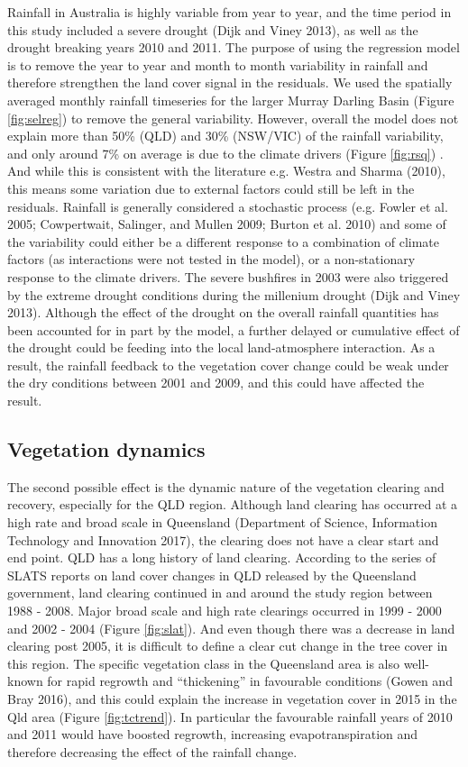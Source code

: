 \documentclass[fleqn,10pt,lineno]{wlpeerj} %
\begin{document}
Rainfall in Australia is highly variable from year to year, and the time
period in this study included a severe drought (Dijk and Viney 2013), as
well as the drought breaking years 2010 and 2011. The purpose of using
the regression model is to remove the year to year and month to month
variability in rainfall and therefore strengthen the land cover signal
in the residuals. We used the spatially averaged monthly rainfall
timeseries for the larger Murray Darling Basin (Figure \ref{fig:selreg})
to remove the general variability. However, overall the model does not
explain more than 50\% (QLD) and 30\% (NSW/VIC) of the rainfall
variability, and only around 7\% on average is due to the climate
drivers (Figure \ref{fig:rsq}) . And while this is consistent with the
literature e.g. Westra and Sharma (2010), this means some variation due
to external factors could still be left in the residuals. Rainfall is
generally considered a stochastic process (e.g. Fowler et al. 2005;
Cowpertwait, Salinger, and Mullen 2009; Burton et al. 2010) and some of
the variability could either be a different response to a combination of
climate factors (as interactions were not tested in the model), or a
non-stationary response to the climate drivers. The severe bushfires in
2003 were also triggered by the extreme drought conditions during the
millenium drought (Dijk and Viney 2013). Although the effect of the
drought on the overall rainfall quantities has been accounted for in
part by the model, a further delayed or cumulative effect of the drought
could be feeding into the local land-atmosphere interaction. As a
result, the rainfall feedback to the vegetation cover change could be
weak under the dry conditions between 2001 and 2009, and this could have
affected the result.

\subsection{Vegetation dynamics}\label{vegetation-dynamics}

The second possible effect is the dynamic nature of the vegetation
clearing and recovery, especially for the QLD region. Although land
clearing has occurred at a high rate and broad scale in Queensland
(Department of Science, Information Technology and Innovation 2017), the
clearing does not have a clear start and end point. QLD has a long
history of land clearing. According to the series of SLATS reports on
land cover changes in QLD released by the Queensland government, land
clearing continued in and around the study region between 1988 - 2008.
Major broad scale and high rate clearings occurred in 1999 - 2000 and
2002 - 2004 (Figure \ref{fig:slat}). And even though there was a
decrease in land clearing post 2005, it is difficult to define a clear
cut change in the tree cover in this region. The specific vegetation
class in the Queensland area is also well-known for rapid regrowth and
``thickening'' in favourable conditions (Gowen and Bray 2016), and this
could explain the increase in vegetation cover in 2015 in the Qld area
(Figure \ref{fig:tctrend}). In particular the favourable rainfall years
of 2010 and 2011 would have boosted regrowth, increasing
evapotranspiration and therefore decreasing the effect of the rainfall
change.
\end{document}
